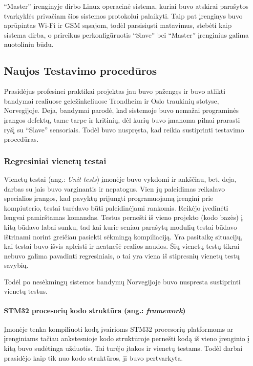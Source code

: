 \documentclass[12pt, a4paper, lithuanian, final]{article}
\begin{document}
"`Master"' įrenginyje dirbo Linux operacinė sistema, kuriai buvo atskirai parašytos tvarkyklės privačiam šios sistemos protokolui palaikyti.
Taip pat įrenginys buvo aprūpintas Wi-Fi ir GSM sąsajom, todėl parsisiųsti matavimus, stebėti kaip sistema dirba, o prireikus perkonfigūruotis "`Slave"' bei "`Master"' įrenginius galima nuotoliniu būdu.



\subsection{Naujos Testavimo procedūros}


Prasidėjus profesinei praktikai projektas jau buvo pažengęs ir buvo atlikti bandymai realiuose geležinkeliuose Trondheim ir Oslo traukinių stotyse, Norvegijoje.
Deja, bandymai parodė, kad sistemoje buvo nemažai programinės įrangos defektų, tame tarpe ir kritinių, dėl kurių buvo įmanoma pilnai prarasti ryšį su "`Slave"' sensoriais.
Todėl buvo nuspręsta, kad reikia sustiprinti testavimo procedūras.

\subsubsection{Regresiniai vienetų testai}


Vienetų testai (ang.: \textit{Unit tests}) įmonėje buvo vykdomi ir ankščiau, bet, deja, darbas su jais buvo varginantis ir nepatogus.
Vien jų paleidimas reikalavo specialios įrangos, kad pavyktų prijungti programuojamą įrenginį prie kompiuterio,
testai turėdavo būti paleidinėjami rankomis. Reikėjo įvedinėti lengvai pamirštamas komandas.
Testus pernešti iš vieno projekto (kodo bazės) į kitą būdavo labai sunku, tad kai kurie seniau parašytų modulių testai būdavo ištrinami norint greičiau pasiekti sėkmingą kompiliaciją.
Yra pasitaikę situacijų, kai testai buvo išvis apleisti ir neatnešė realios naudos.
Šių vienetų testų tikrai nebuvo galima pavadinti regresiniais, o tai yra viena iš stipresnių vienetų testų savybių.

Todėl po nesėkmingų sistemos bandymų Norvegijoje buvo nuspresta sustiprinti vienetų testus.

\paragraph{STM32 procesorių kodo struktūra (ang.: \textit{framework})}

Įmonėje tenka kompiliuoti kodą įvairioms STM32 procesorių platformoms ar įrenginiams tačiau ankstesnioje kodo struktūroje pernešti kodą iš vieno įrenginio į kitą buvo sudėtinga užduotis.
Tai turėjo įtakos ir vienetų testams.
Todėl darbai prasidėjo kaip tik nuo kodo struktūros, ji buvo pertvarkyta.
\end{document}
